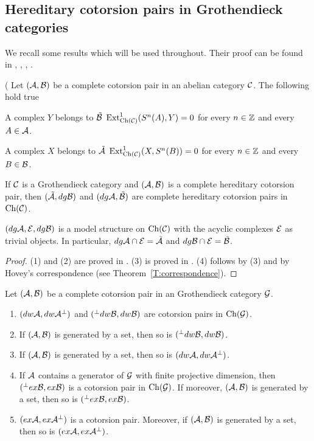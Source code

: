 \subsection{Hereditary cotorsion pairs in Grothendieck categories}

We recall some results which will be used throughout. Their proof can be found in \cite{St10-deconstr}, \cite{Sto13},  \cite{G4}, \cite{G6}.

 \begin{prop}\label{P:description-tilde} (\cite[Proposition 7.13, 7.14]{Sto13} Let $(\mathcal{A}, \mathcal{B})$ be a complete cotorsion pair in an abelian category $\mathcal{C}$. The following hold true
  \begin{enumerate}
    \begin{sloppypar}
    \item A complex $Y$ belongs to $\tilde{\mathcal{B}}$ \iff ${\operatorname{Ext}^1_{\mathrm{Ch}(\mathcal{C})}(S^n(A), Y)=0}$ for every $n\in \mathbb{Z}$ and every $A\in \mathcal{A}$.
    \item A complex $X$ belongs to $\tilde{\mathcal{A}}$ \iff ${\operatorname{Ext}^1_{\mathrm{Ch}(\mathcal{C})}(X, S^n(B))=0}$ for every $n\in \mathbb{Z}$ and every $B\in \mathcal{B}$.
    \end{sloppypar}
  \item If $\mathcal{C}$ is a Grothendieck category and $(\mathcal{A}, \mathcal{B})$ is a complete hereditary cotorsion pair, then $(\tilde{\mathcal{A}}, dg\mathcal{B})$ and $(dg \mathcal{A}, \tilde {\mathcal{B}})$ are complete hereditary cotorsion pairs in $\mathrm{Ch}(\mathcal{C})$.

    \item $(dg\mathcal{A}, \mathcal{E}, dg\mathcal{B})$ is a model structure on $\mathrm{Ch}(\mathcal{C})$ with the acyclic complexes $\mathcal{E}$ as trivial objects. In particular, $dg\mathcal{A}\cap\mathcal{E}=\tilde {\mathcal{A}}$ and $dg\mathcal{B}\cap\mathcal{E}=\tilde {\mathcal{B}}$.
  \end{enumerate}
  \end{prop}
  \begin{proof}
 (1) and (2) are proved in \cite[Lemma 7.13]{Sto13}. (3) is proved in \cite[Proposition 7.14]{Sto13}.
  (4) follows by (3) and by Hovey's correspondence (see Theorem~\ref{T:correspondence}).
  \end{proof}
   \begin{prop}\label{P:complete?} Let $(\mathcal{A}, \mathcal{B})$ be a complete cotorsion pair in an Grothendieck category $\mathcal{G}$.
 \begin{enumerate}
  \item $(dw\mathcal{A}, dw\mathcal{A}^\perp)$ and $(^\perp dw\mathcal{B}, dw\mathcal{B})$ are cotorsion pairs in $\mathrm{Ch}(\mathcal{G})$.
  \item If $(\mathcal{A}, \mathcal{B})$ is generated by a set, then so is $(^\perp dw\mathcal{B}, dw\mathcal{B})$.
  \item If $(\mathcal{A}, \mathcal{B})$ is generated by a set, then so is $(dw\mathcal{A}, dw\mathcal{A}^\perp)$.

  \item If $\mathcal{A}$ contains a generator of $\mathcal{G}$ with finite projective dimension,
  then $(^\perp ex\mathcal{B}, ex\mathcal{B})$ is a cotorsion pair in $\mathrm{Ch}(\mathcal{G})$. If moreover, $(\mathcal{A}, \mathcal{B})$ is generated by a set, then so is $(^\perp ex\mathcal{B}, ex\mathcal{B})$.
  \item $(ex\mathcal{A}, ex\mathcal{A}^\perp)$ is a cotorsion pair. Moreover, if $(\mathcal{A}, \mathcal{B})$ is generated by a set, then so is $(ex\mathcal{A}, ex\mathcal{A}^\perp)$.


   \end{enumerate}
  \end{prop}
